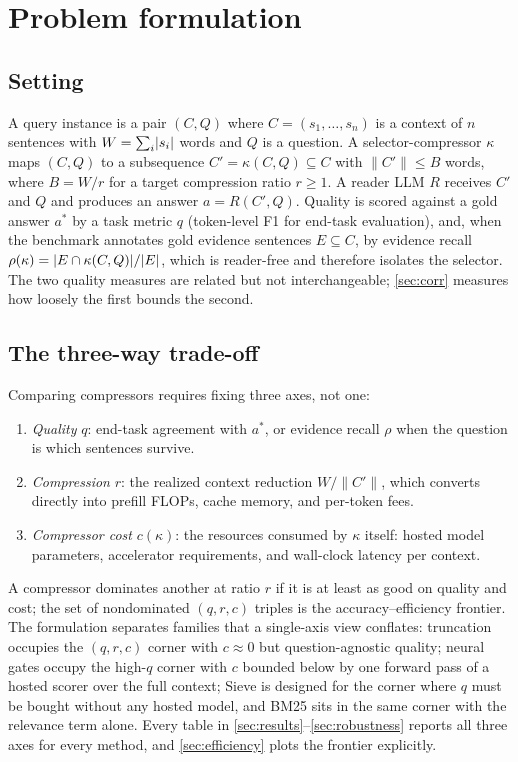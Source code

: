 \documentclass[preprint,12pt]{elsarticle}
\DeclarePairedDelimiter\abs{\lvert}{\rvert}
\theoremstyle{remark}
\newcommand{\method}{Sieve}
\begin{document}
\section{Problem formulation}
\label{sec:formulation}

\subsection{Setting}
A query instance is a pair $(C, Q)$ where $C = (s_1, \ldots, s_n)$ is
a context of $n$ sentences with $W = \sum_i \abs{s_i}$ words and $Q$
is a question. A selector-compressor $\kappa$ maps $(C, Q)$ to a
subsequence $C' = \kappa(C, Q) \subseteq C$ with
$\lVert C' \rVert \le B$ words, where $B = W / r$ for a target
compression ratio $r \ge 1$. A reader LLM $R$ receives $C'$ and $Q$
and produces an answer $a = R(C', Q)$. Quality is scored against a
gold answer $a^{*}$ by a task metric $q$ (token-level F1 for end-task
evaluation), and, when the benchmark annotates gold evidence sentences
$E \subseteq C$, by evidence recall
$\rho(\kappa) = \abs{E \cap \kappa(C, Q)} / \abs{E}$, which is
reader-free and therefore isolates the selector. The two quality
measures are related but not interchangeable; \autoref{sec:corr}
measures how loosely the first bounds the second.

\subsection{The three-way trade-off}
\label{sec:tradeoff}
Comparing compressors requires fixing three axes, not one:
\begin{enumerate}[label=(\roman*)]
\item \emph{Quality} $q$: end-task agreement with $a^{*}$, or evidence
recall $\rho$ when the question is which sentences survive.
\item \emph{Compression} $r$: the realized context reduction
$W / \lVert C' \rVert$, which converts directly into prefill FLOPs,
cache memory, and per-token fees.
\item \emph{Compressor cost} $c(\kappa)$: the resources consumed by
$\kappa$ itself: hosted model parameters, accelerator requirements,
and wall-clock latency per context.
\end{enumerate}
A compressor dominates another at ratio $r$ if it is at least as good
on quality and cost; the set of nondominated $(q, r, c)$ triples is
the accuracy--efficiency frontier. The formulation separates families
that a single-axis view conflates: truncation occupies the $(q, r, c)$
corner with $c \approx 0$ but question-agnostic quality; neural gates
occupy the high-$q$ corner with $c$ bounded below by one forward pass
of a hosted scorer over the full context; \method{} is designed for
the corner where $q$ must be bought without any hosted model, and BM25
sits in the same corner with the relevance term alone. Every table in
\autoref{sec:results}--\autoref{sec:robustness} reports all three axes
for every method, and \autoref{sec:efficiency} plots the frontier
explicitly.
\end{document}
